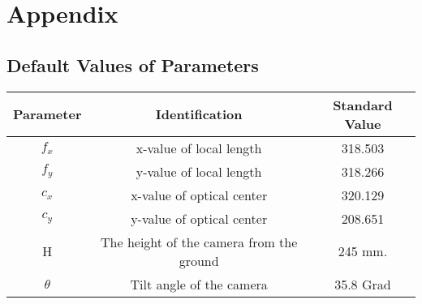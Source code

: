 %
\appendix 
\chapter{Appendix} \label{Appendix}
\section{Default Values of Parameters} 


\begin{center}
  \begin{tabular}{ | c | c | c | }
    \hline
    Parameter & Identification				 			 &  Standard Value   \\ \hline
    $ f_{x} $ & x-value of local length 			     &  318.503  \\ \hline
    $ f_{y} $ & y-value of local length 			     &  318.266  \\ \hline
    $ c_{x} $ & x-value of optical center			     &  320.129  \\ \hline
    $ c_{y} $ & y-value of optical center	  			 &  208.651  \\ \hline
    H		  & The height of the camera from the ground &  245 mm.  \\ \hline
    $ \theta $& Tilt angle of the camera      			 &  35.8 Grad  \\ \hline
  


  \end{tabular}
  \label{tab:parameters}
\end{center}

%